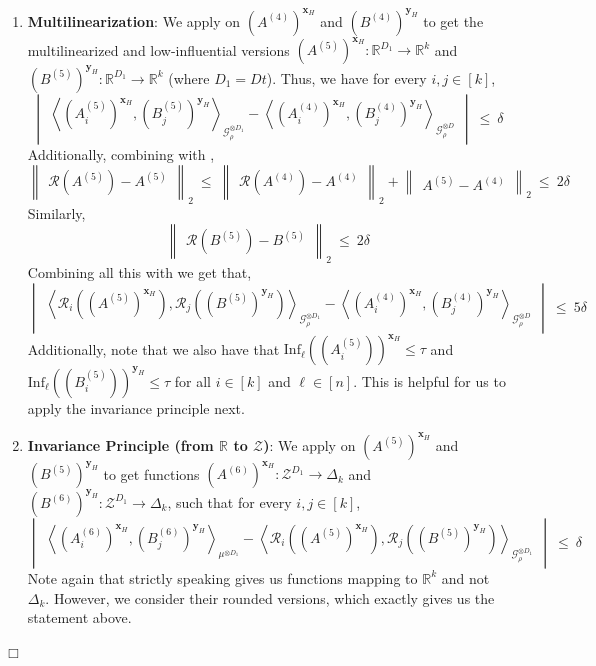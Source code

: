 \documentclass[11pt]{article}
\newcommand{\inparen}[1]{\left ( #1 \right )}
\newcommand{\inangle}[1]{\left \langle #1 \right \rangle}
\newcommand{\inabs}[1]{\begin{vmatrix} #1 \end{vmatrix}}
\newcommand{\norm}[2]{\begin{Vmatrix} #2 \end{Vmatrix}_{#1}}
\DeclareMathOperator*{\Ex}{\mathbb{E}}
\newcommand{\eps}{\varepsilon}
\newcommand{\bbR}{{\mathbb R}}
\newcommand{\bx}{{\bm x}}
\newcommand{\by}{{\bm y}}
\newcommand{\calG}{\mathcal{G}}
\newcommand{\calR}{\mathcal{R}}
\newcommand{\calZ}{\mathcal{Z}}
\newcommand{\Inf}{\mathrm{Inf}}
\newenvironment{proofof}[1]{\noindent {\em Proof of #1.} \hspace*{1mm}}{\hfill $\Box$}
\begin{document}
\begin{proofof}{\Cref{thm:non-int-sim}}
\begin{enumerate}
	\item {\bf Multilinearization}: We apply  on $(A^{(4)})^{\bx_H}$ and $(B^{(4)})^{\by_H}$ to get the multilinearized and low-influential versions $(A^{(5)})^{\bx_H} : \bbR^{D_1} \to \bbR^k$ and $(B^{(5)})^{\by_H} : \bbR^{D_1} \to \bbR^k$ (where $D_1 = Dt$). Thus, we have for every $i, j \in [k]$,
	\[ \inabs{\inangle{(A^{(5)}_i)^{\bx_H}, (B^{(5)}_j)^{\by_H}}_{\calG_\rho^{\otimes D_1}} - \inangle{(A^{(4)}_i)^{\bx_H}, (B^{(4)}_j)^{\by_H}}_{\calG_\rho^{\otimes D}}} ~\le~ \delta \]
	Additionally, combining with ,
	\[ \norm{2}{\calR(A^{(5)}) - A^{(5)}} ~\le~ \norm{2}{\calR(A^{(4)}) - A^{(4)}} + \norm{2}{A^{(5)} - A^{(4)}} ~\le~ 2\delta \]
	Similarly,
	\[ \norm{2}{\calR(B^{(5)}) - B^{(5)}} ~\le~ 2\delta \]
	Combining all this with  we get that,
	\begin{equation}
	\inabs{\inangle{\calR_i\inparen{(A^{(5)})^{\bx_H}}, \calR_j\inparen{(B^{(5)})^{\by_H}}}_{\calG_\rho^{\otimes D_1}} - \inangle{(A^{(4)}_i)^{\bx_H}, (B^{(4)}_j)^{\by_H}}_{\calG_\rho^{\otimes D}}} ~\le~ 5\delta \label{eqn:NIS-5}
	\end{equation}
	Additionally, note that we also have that $\Inf_\ell((A^{(5)}_i))^{\bx_H} \le \tau$ and $\Inf_\ell((B^{(5)}_i))^{\by_H} \le \tau$ for all $i \in [k]$ and $\ell \in [n]$. This is helpful for us to apply the invariance principle next.
	
	\item {\bf Invariance Principle (from $\bbR$ to $\calZ$)}: We apply  on $(A^{(5)})^{\bx_H}$ and $(B^{(5)})^{\by_H}$ to get functions $(A^{(6)})^{\bx_H} : \calZ^{D_1} \to \Delta_k$ and $(B^{(6)})^{\by_H} : \calZ^{D_1} \to \Delta_k$, such that for every $i, j \in [k]$,
	\begin{equation}
	\inabs{\inangle{(A^{(6)}_i)^{\bx_H}, (B^{(6)}_j)^{\by_H}}_{\mu^{\otimes D_1}} - \inangle{\calR_i\inparen{(A^{(5)})^{\bx_H}}, \calR_j\inparen{(B^{(5)})^{\by_H}}}_{\calG_\rho^{\otimes D_1}}} ~\le~ \delta \label{eqn:NIS-6}
	\end{equation}
	Note again that strictly speaking  gives us functions mapping to $\bbR^k$ and not $\Delta_k$. However, we consider their rounded versions, which exactly gives us the statement above.
	

\end{enumerate}
\end{proofof}
\end{document}

